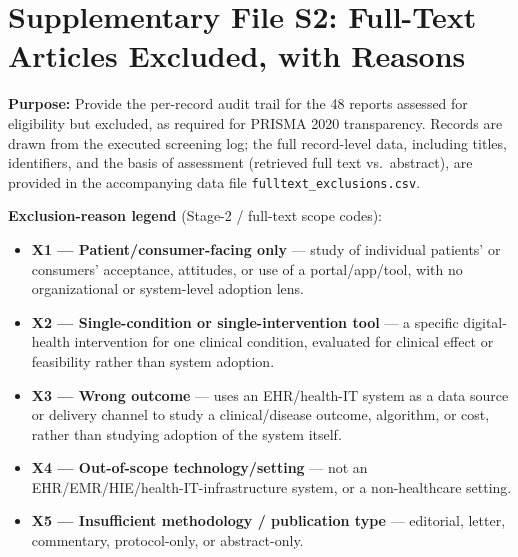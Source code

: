 
\newpage
\section*{Supplementary File S2: Full-Text Articles Excluded, with Reasons}
\label{sec:S2}

\noindent\textbf{Purpose:} Provide the per-record audit trail for the 48 reports
assessed for eligibility but excluded, as required for PRISMA 2020 transparency.
Records are drawn from the executed screening log; the full record-level data,
including titles, identifiers, and the basis of assessment (retrieved full text
vs.\ abstract), are provided in the accompanying data file
\texttt{fulltext\_exclusions.csv}.

\medskip
\noindent\textbf{Exclusion-reason legend} (Stage-2 / full-text scope codes):
\begin{itemize}
\item \textbf{X1 --- Patient/consumer-facing only} --- study of individual
  patients' or consumers' acceptance, attitudes, or use of a portal/app/tool,
  with no organizational or system-level adoption lens.
\item \textbf{X2 --- Single-condition or single-intervention tool} --- a specific
  digital-health intervention for one clinical condition, evaluated for clinical
  effect or feasibility rather than system adoption.
\item \textbf{X3 --- Wrong outcome} --- uses an EHR/health-IT system as a data
  source or delivery channel to study a clinical/disease outcome, algorithm, or
  cost, rather than studying adoption of the system itself.
\item \textbf{X4 --- Out-of-scope technology/setting} --- not an
  EHR/EMR/HIE/health-IT-infrastructure system, or a non-healthcare setting.
\item \textbf{X5 --- Insufficient methodology / publication type} --- editorial,
  letter, commentary, protocol-only, or abstract-only.
\end{itemize}

\renewcommand{\arraystretch}{1.25}
\setlength{\tabcolsep}{5pt}

